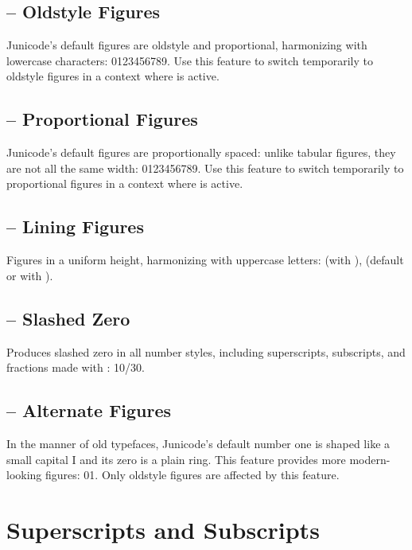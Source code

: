 \subsection{ – Oldstyle Figures}
Junicode's default figures are oldstyle and proportional, harmonizing with lowercase characters:
0123456789. Use this feature to switch temporarily to oldstyle figures in a context where
 is active.

\subsection{ – Proportional Figures}
Junicode's default figures are proportionally spaced: unlike tabular figures, they are not
all the same width: 0123456789. Use this feature to switch temporarily to proportional figures in a context where
 is active.

\subsection{ – Lining Figures}
Figures in a uniform height, harmonizing with uppercase letters:  (with
),  (default or with ).

\subsection{ – Slashed Zero}
Produces slashed zero in all number styles, including superscripts, subscripts, and fractions made with
: {   
 10/30}.

\subsection{ – Alternate Figures}
In the manner of old typefaces, Junicode's default number one is shaped like a small capital I and
its zero is a plain ring. This feature provides more modern-looking figures:
{01}. Only oldstyle figures
are affected by this feature.

\section{Superscripts and Subscripts}

